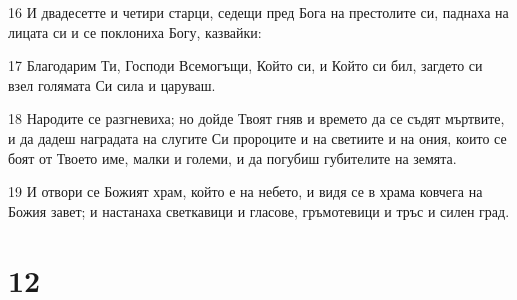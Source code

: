 \par 16 И двадесетте и четири старци, седещи пред Бога на престолите си, паднаха на лицата си и се поклониха Богу, казвайки:
\par 17 Благодарим Ти, Господи Всемогъщи, Който си, и Който си бил, загдето си взел голямата Си сила и царуваш.
\par 18 Народите се разгневиха; но дойде Твоят гняв и времето да се съдят мъртвите, и да дадеш наградата на слугите Си пророците и на светиите и на ония, които се боят от Твоето име, малки и големи, и да погубиш губителите на земята.
\par 19 И отвори се Божият храм, който е на небето, и видя се в храма ковчега на Божия завет; и настанаха светкавици и гласове, гръмотевици и тръс и силен град.

\chapter{12}

